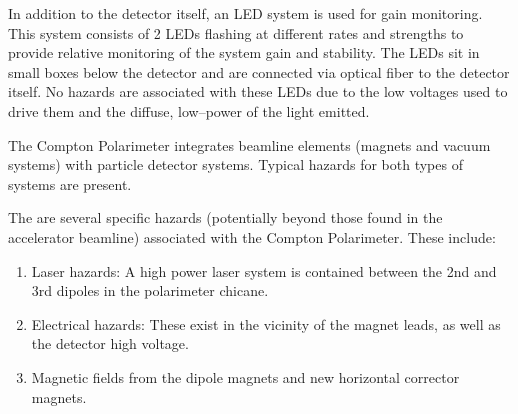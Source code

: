 {In addition to the detector itself, an LED system is used for gain monitoring. This system consists of 2 LEDs flashing
at different rates and strengths to provide relative monitoring of the system gain and stability. The LEDs sit in
small boxes below the detector and are connected via optical fiber to the detector itself. No hazards are associated
with these LEDs due to the low voltages used to drive them and the diffuse, low--power of the light emitted.



\begin{safetyen}{0}{0}
%
%

The Compton Polarimeter integrates beamline elements (magnets and vacuum systems) with
particle detector systems. Typical hazards for both types of systems are present.


The are several specific hazards (potentially beyond those found in the accelerator beamline)
associated with the Compton Polarimeter.  These include:
\begin{enumerate}
\item{Laser hazards: A high power laser system is contained between the 2nd and 3rd dipoles in the polarimeter chicane.}
\item{Electrical hazards: These exist in the vicinity of the magnet leads, as well as the detector high
voltage.}
\item{Magnetic fields from the dipole magnets and new horizontal corrector magnets.}
\end{enumerate}



\end{safetyen}}
